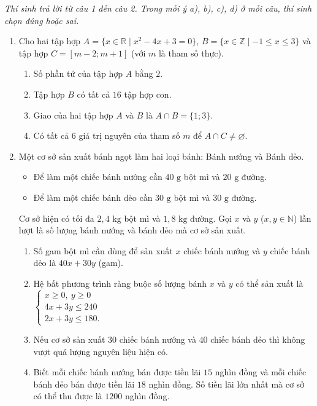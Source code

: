 \documentclass[12pt,a4paper]{article}
\newcommand{\parttitle}[1]{\par\vspace{1.5pt}\needspace{2\baselineskip}{\large\bfseries\color{ink}#1}\par\nopagebreak\vspace{1pt}}
\begin{document}
\parttitle{PHẦN II. Trắc nghiệm đúng/sai}
\textit{Thí sinh trả lời từ câu 1 đến câu 2. Trong mỗi ý a), b), c), d) ở mỗi câu, thí sinh chọn đúng hoặc sai.}
\begin{enumerate}
\item Cho hai tập hợp $A = \{x \in \mathbb{R} \mid x^2 - 4x + 3 = 0\}$, $B = \{x \in \mathbb{Z} \mid -1 \le x \le 3\}$ và tập hợp $C = [m - 2; m + 1]$ (với $m$ là tham số thực).
\begin{enumerate}
    \item Số phần tử của tập hợp $A$ bằng $2$.
    \item Tập hợp $B$ có tất cả $16$ tập hợp con.
    \item Giao của hai tập hợp $A$ và $B$ là $A \cap B = \{1; 3\}$.
    \item Có tất cả $6$ giá trị nguyên của tham số $m$ để $A \cap C \ne \varnothing$.
\end{enumerate}

\item Một cơ sở sản xuất bánh ngọt làm hai loại bánh: Bánh nướng và Bánh dẻo.
\begin{itemize}[leftmargin=1.5em, itemsep=0.1pt]
    \item Để làm một chiếc bánh nướng cần $40\text{ g}$ bột mì và $20\text{ g}$ đường.
    \item Để làm một chiếc bánh dẻo cần $30\text{ g}$ bột mì và $30\text{ g}$ đường.
\end{itemize}
Cơ sở hiện có tối đa $2{,}4\text{ kg}$ bột mì và $1{,}8\text{ kg}$ đường. Gọi $x$ và $y$ ($x, y \in \mathbb{N}$) lần lượt là số lượng bánh nướng và bánh dẻo mà cơ sở sản xuất.
\begin{enumerate}
    \item Số gam bột mì cần dùng để sản xuất $x$ chiếc bánh nướng và $y$ chiếc bánh dẻo là $40x + 30y$ (gam).
    \item Hệ bất phương trình ràng buộc số lượng bánh $x$ và $y$ có thể sản xuất là $\begin{cases} x \ge 0,\ y \ge 0 \\ 4x + 3y \le 240 \\ 2x + 3y \le 180. \end{cases}$
    \item Nếu cơ sở sản xuất $30$ chiếc bánh nướng và $40$ chiếc bánh dẻo thì không vượt quá lượng nguyên liệu hiện có.
    \item Biết mỗi chiếc bánh nướng bán được tiền lãi $15$ nghìn đồng và mỗi chiếc bánh dẻo bán được tiền lãi $18$ nghìn đồng. Số tiền lãi lớn nhất mà cơ sở có thể thu được là $1200$ nghìn đồng.
\end{enumerate}
\end{enumerate}
\end{document}
